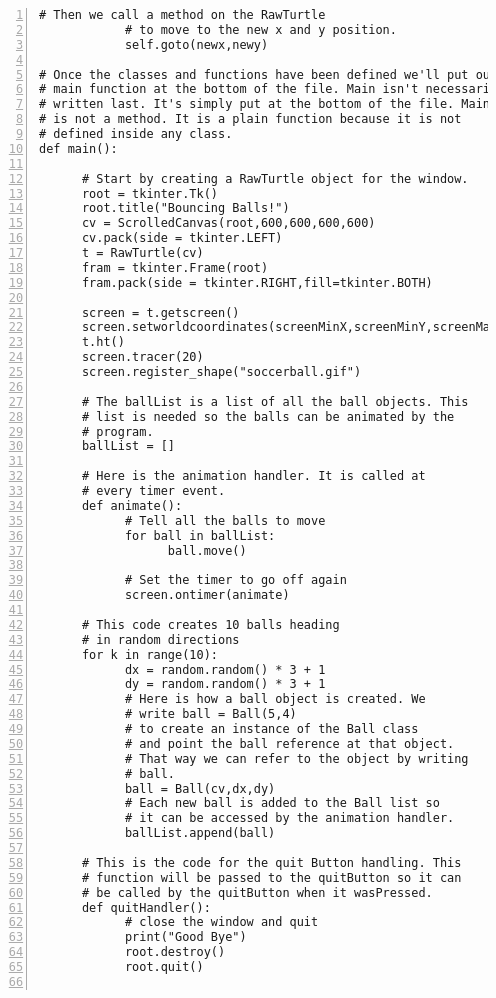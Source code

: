 \begin{lstlisting}[basicstyle=\ttfamily\scriptsize,numbers=left]
            # Then we call a method on the RawTurtle 
            # to move to the new x and y position.
            self.goto(newx,newy)

# Once the classes and functions have been defined we'll put our
# main function at the bottom of the file. Main isn't necessarily
# written last. It's simply put at the bottom of the file. Main
# is not a method. It is a plain function because it is not 
# defined inside any class. 
def main():

      # Start by creating a RawTurtle object for the window. 
      root = tkinter.Tk()
      root.title("Bouncing Balls!")
      cv = ScrolledCanvas(root,600,600,600,600)
      cv.pack(side = tkinter.LEFT)
      t = RawTurtle(cv)
      fram = tkinter.Frame(root)
      fram.pack(side = tkinter.RIGHT,fill=tkinter.BOTH)

      screen = t.getscreen()
      screen.setworldcoordinates(screenMinX,screenMinY,screenMaxX,screenMaxY)
      t.ht()
      screen.tracer(20)
      screen.register_shape("soccerball.gif")

      # The ballList is a list of all the ball objects. This 
      # list is needed so the balls can be animated by the 
      # program. 
      ballList = []

      # Here is the animation handler. It is called at
      # every timer event.
      def animate():
            # Tell all the balls to move
            for ball in ballList:
                  ball.move()

            # Set the timer to go off again
            screen.ontimer(animate)

      # This code creates 10 balls heading
      # in random directions
      for k in range(10):
            dx = random.random() * 3 + 1
            dy = random.random() * 3 + 1
            # Here is how a ball object is created. We 
            # write ball = Ball(5,4)
            # to create an instance of the Ball class
            # and point the ball reference at that object.
            # That way we can refer to the object by writing
            # ball. 
            ball = Ball(cv,dx,dy)
            # Each new ball is added to the Ball list so 
            # it can be accessed by the animation handler.
            ballList.append(ball)

      # This is the code for the quit Button handling. This
      # function will be passed to the quitButton so it can
      # be called by the quitButton when it wasPressed.
      def quitHandler():
            # close the window and quit
            print("Good Bye")
            root.destroy()
            root.quit()
            

\end{lstlisting}
